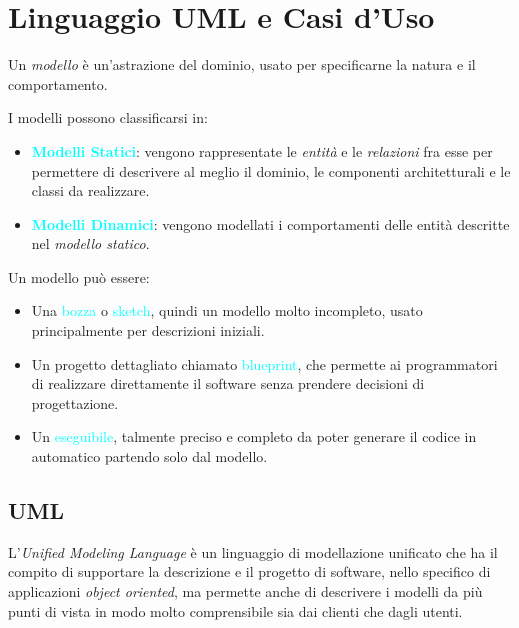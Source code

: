 \newpage

\section{Linguaggio UML e Casi d'Uso}

\begin{definition}[Modello]
    Un \emph{modello} è un'astrazione del dominio, usato per specificarne la natura e il comportamento.
\end{definition}

I modelli possono classificarsi in:
\begin{itemize}
    \item \textbf{\textcolor{cyan}{Modelli Statici}}: vengono rappresentate le \emph{entità} e le \emph{relazioni} fra esse per permettere di descrivere al meglio
        il dominio, le componenti architetturali e le classi da realizzare.
    \item \textbf{\textcolor{cyan}{Modelli Dinamici}}: vengono modellati i comportamenti delle entità descritte nel \emph{modello statico}.
\end{itemize}

Un modello può essere:
\begin{itemize}
    \item Una \textcolor{cyan}{bozza} o \textcolor{cyan}{sketch}, quindi un modello molto incompleto,
        usato principalmente per descrizioni iniziali.
    \item Un progetto dettagliato chiamato \textcolor{cyan}{blueprint},
        che permette ai programmatori di realizzare direttamente il software senza prendere decisioni di
        progettazione.
    \item Un \textcolor{cyan}{eseguibile}, talmente preciso e completo da poter generare il codice
        in automatico partendo solo dal modello.
\end{itemize}

\subsection{UML}

\begin{definition}[UML]
    L'\emph{Unified Modeling Language} è un linguaggio di modellazione unificato che ha il compito
    di supportare la descrizione e il progetto di software, nello specifico di applicazioni \emph{object oriented}, ma permette
    anche di descrivere i modelli da più punti di vista in modo molto comprensibile sia dai clienti che dagli utenti.
\end{definition}

